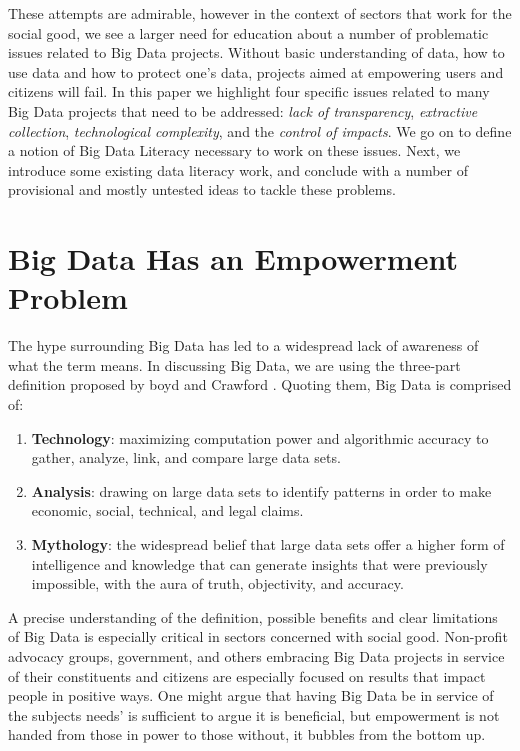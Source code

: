 \documentclass{sig-alternate}
\begin{document}
These attempts are admirable, however in the context of sectors that work for the social good, we see a larger need for education about a number of problematic issues related to Big Data projects.  Without basic understanding of data, how to use data and how to protect one's data, projects aimed at empowering users and citizens will fail. In this paper we highlight four specific issues related to many Big Data projects that need to be addressed: \textit{lack of transparency}, \textit{extractive collection}, \textit{technological complexity}, and the \textit{control of impacts}.  We go on to define a notion of Big Data Literacy necessary to work on these issues.  Next, we introduce some existing data literacy work, and conclude with a number of provisional and mostly untested ideas to tackle these problems.

\section{Big Data Has an Empowerment\\Problem}

The hype surrounding Big Data has led to a widespread lack of awareness of what the term means. In discussing Big Data, we are using the three-part definition proposed by boyd and Crawford \cite{boyd_critical_2012}. Quoting them, Big Data is comprised of:

\begin{enumerate} 
\item \textbf{Technology}: maximizing computation power and algorithmic accuracy to gather, analyze, link, and compare large data sets.
\item \textbf{Analysis}: drawing on large data sets to identify patterns in order to make economic, social, technical, and legal claims.
\item \textbf{Mythology}: the widespread belief that large data sets offer a higher form of intelligence and knowledge that can generate insights that were previously impossible, with the aura of truth, objectivity, and accuracy.
\end{enumerate}

A precise understanding of the definition, possible benefits and clear limitations of Big Data is especially critical in sectors concerned with social good.  Non-profit advocacy groups, government, and others embracing Big Data projects in service of their constituents and citizens are especially focused on results that impact people in positive ways. One might argue that having Big Data be in service of the subjects needs' is sufficient to argue it is beneficial, but empowerment is not handed from those in power to those without, it bubbles from the bottom up. 
\end{document}
